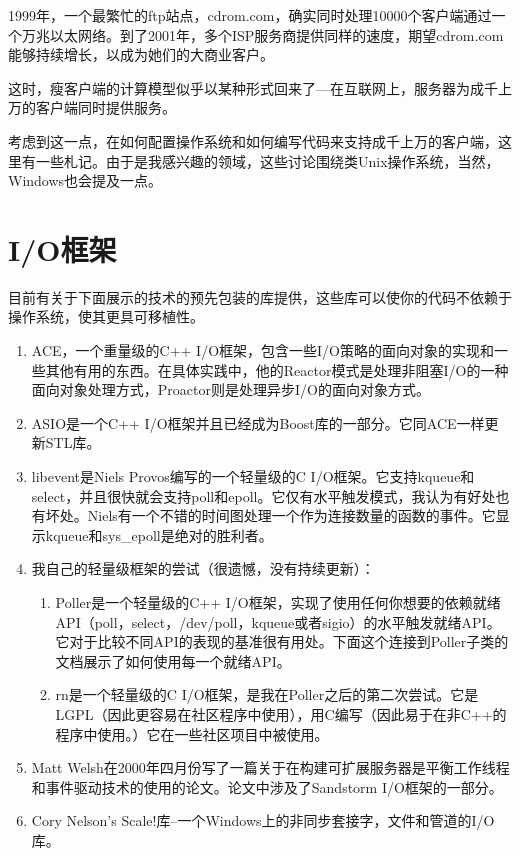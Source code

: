 \documentclass[12pt, twoside, a4paper, xetex]{report}
\begin{document}
	1999年，一个最繁忙的ftp站点，cdrom.com，确实同时处理10000个客户端通过一个万兆以太网络。到了2001年，多个ISP服务商提供同样的速度，期望cdrom.com能够持续增长，以成为她们的大商业客户。
	
	这时，瘦客户端的计算模型似乎以某种形式回来了---在互联网上，服务器为成千上万的客户端同时提供服务。
	
	考虑到这一点，在如何配置操作系统和如何编写代码来支持成千上万的客户端，这里有一些札记。由于是我感兴趣的领域，这些讨论围绕类Unix操作系统，当然，Windows也会提及一点。	

\section*{I/O框架}
	目前有关于下面展示的技术的预先包装的库提供，这些库可以使你的代码不依赖于操作系统，使其更具可移植性。
	\begin{enumerate}
	
	\item ACE，一个重量级的C++ I/O框架，包含一些I/O策略的面向对象的实现和一些其他有用的东西。在具体实践中，他的Reactor模式是处理非阻塞I/O的一种面向对象处理方式，Proactor则是处理异步I/O的面向对象方式。
	\item ASIO是一个C++ I/O框架并且已经成为Boost库的一部分。它同ACE一样更新STL库。
	\item libevent是Niels Provos编写的一个轻量级的C I/O框架。它支持kqueue和select，并且很快就会支持poll和epoll。它仅有水平触发模式，我认为有好处也有坏处。Niels有一个不错的时间图处理一个作为连接数量的函数的事件。它显示kqueue和sys\_epoll是绝对的胜利者。
	\item 我自己的轻量级框架的尝试（很遗憾，没有持续更新）：
		\begin{enumerate}
		\item Poller是一个轻量级的C++ I/O框架，实现了使用任何你想要的依赖就绪API（poll，select，/dev/poll，kqueue或者sigio）的水平触发就绪API。它对于比较不同API的表现的基准很有用处。下面这个连接到Poller子类的文档展示了如何使用每一个就绪API。
		\item rn是一个轻量级的C I/O框架，是我在Poller之后的第二次尝试。它是LGPL（因此更容易在社区程序中使用），用C编写（因此易于在非C++的程序中使用。）它在一些社区项目中被使用。
		\end{enumerate}
	\item Matt Welsh在2000年四月份写了一篇关于在构建可扩展服务器是平衡工作线程和事件驱动技术的使用的论文。论文中涉及了Sandstorm I/O框架的一部分。
	\item Cory Nelson's Scale!库--一个Windows上的非同步套接字，文件和管道的I/O库。
	\end{enumerate}
	
\end{document}

